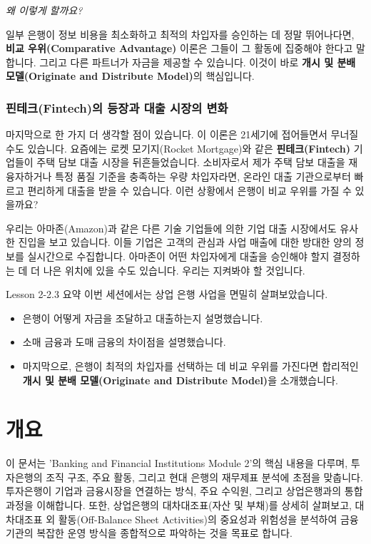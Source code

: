 \documentclass[11pt,a4paper]{article}
\begin{document}
\begin{center}
    \textit{왜 이렇게 할까요?}
\end{center}

일부 은행이 정보 비용을 최소화하고 최적의 차입자를 승인하는 데 정말 뛰어나다면, \textbf{비교 우위(Comparative Advantage)} 이론은 그들이 그 활동에 집중해야 한다고 말합니다. 그리고 다른 파트너가 자금을 제공할 수 있습니다. 이것이 바로 \textbf{개시 및 분배 모델(Originate and Distribute Model)}의 핵심입니다.

\subsubsection*{핀테크(Fintech)의 등장과 대출 시장의 변화}
마지막으로 한 가지 더 생각할 점이 있습니다. 이 이론은 21세기에 접어들면서 무너질 수도 있습니다. 요즘에는 로켓 모기지(Rocket Mortgage)와 같은 \textbf{핀테크(Fintech)} 기업들이 주택 담보 대출 시장을 뒤흔들었습니다. 소비자로서 제가 주택 담보 대출을 재융자하거나 특정 품질 기준을 충족하는 우량 차입자라면, 온라인 대출 기관으로부터 빠르고 편리하게 대출을 받을 수 있습니다. 이런 상황에서 은행이 비교 우위를 가질 수 있을까요?

우리는 아마존(Amazon)과 같은 다른 기술 기업들에 의한 기업 대출 시장에서도 유사한 진입을 보고 있습니다. 이들 기업은 고객의 관심과 사업 매출에 대한 방대한 양의 정보를 실시간으로 수집합니다. 아마존이 어떤 차입자에게 대출을 승인해야 할지 결정하는 데 더 나은 위치에 있을 수도 있습니다. 우리는 지켜봐야 할 것입니다.

\begin{summarybox}{Lesson 2-2.3 요약}
이번 세션에서는 상업 은행 사업을 면밀히 살펴보았습니다.
\begin{itemize}
    \item 은행이 어떻게 자금을 조달하고 대출하는지 설명했습니다.
    \item 소매 금융과 도매 금융의 차이점을 설명했습니다.
    \item 마지막으로, 은행이 최적의 차입자를 선택하는 데 비교 우위를 가진다면 합리적인 \textbf{개시 및 분배 모델(Originate and Distribute Model)}을 소개했습니다.
\end{itemize}
\end{summarybox}

\newpage

\newpage
\section*{개요}
이 문서는 'Banking and Financial Institutions Module 2'의 핵심 내용을 다루며, 투자은행의 조직 구조, 주요 활동, 그리고 현대 은행의 재무제표 분석에 초점을 맞춥니다. 투자은행이 기업과 금융시장을 연결하는 방식, 주요 수익원, 그리고 상업은행과의 통합 과정을 이해합니다. 또한, 상업은행의 대차대조표(자산 및 부채)를 상세히 살펴보고, 대차대조표 외 활동(Off-Balance Sheet Activities)의 중요성과 위험성을 분석하여 금융기관의 복잡한 운영 방식을 종합적으로 파악하는 것을 목표로 합니다.
\end{document}
